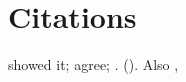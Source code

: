 \documentclass{article}
\begin{document}
\section{Citations}
\citet{knuth84} showed it; \citep{lamport94,knuth86} agree; \citep[see][p.~3]{turing36}.
\citeauthor{cousot77} (\citeyear{cousot77}). Also \citealp{pgf}, \nocite{doe20,roe19}

\end{document}
